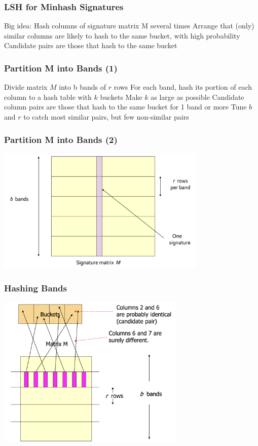 \documentclass[svgnames]{beamer}
\begin{document}
  
\begin{frame} \frametitle{LSH for Minhash Signatures}

Big idea: Hash columns of signature matrix M several times
Arrange that (only) similar columns are likely to hash to the same bucket, with high probability
Candidate pairs are those that hash to the same bucket

\end{frame}

  
\begin{frame} \frametitle{Partition M into Bands (1)}

Divide matrix $M$ into b bands of $r$ rows
For each band, hash its portion of each column to a hash table with $k$ buckets
Make $k$ as large as possible
Candidate column pairs are those that hash to the same bucket for 1 band or more
Tune $b$ and $r$ to catch most similar pairs, but few non-similar pairs

\end{frame}

  
\begin{frame} \frametitle{Partition M into Bands (2)}

\includegraphics[width=10cm]{bands}

\end{frame}

  
\begin{frame} \frametitle{Hashing Bands}

\includegraphics[width=9cm]{hashing-bands}

\end{frame}
\end{document}
